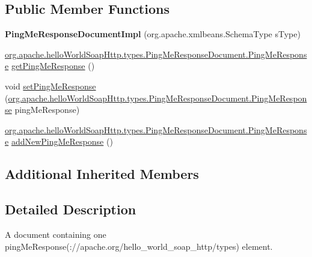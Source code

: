 \subsection*{Public Member Functions}
\begin{DoxyCompactItemize}
\item 
\hypertarget{classorg_1_1apache_1_1hello_world_soap_http_1_1types_1_1impl_1_1_ping_me_response_document_impl_a4f00943c705017667e77100457bf079a}{}{\bfseries Ping\+Me\+Response\+Document\+Impl} (org.\+apache.\+xmlbeans.\+Schema\+Type s\+Type)\label{classorg_1_1apache_1_1hello_world_soap_http_1_1types_1_1impl_1_1_ping_me_response_document_impl_a4f00943c705017667e77100457bf079a}

\item 
\hyperlink{interfaceorg_1_1apache_1_1hello_world_soap_http_1_1types_1_1_ping_me_response_document_1_1_ping_me_response}{org.\+apache.\+hello\+World\+Soap\+Http.\+types.\+Ping\+Me\+Response\+Document.\+Ping\+Me\+Response} \hyperlink{classorg_1_1apache_1_1hello_world_soap_http_1_1types_1_1impl_1_1_ping_me_response_document_impl_a1ae5c560f8c553c511a1318bc93695b2}{get\+Ping\+Me\+Response} ()
\item 
void \hyperlink{classorg_1_1apache_1_1hello_world_soap_http_1_1types_1_1impl_1_1_ping_me_response_document_impl_a4367f5d3eb9c3a5f6446a562bc6647b5}{set\+Ping\+Me\+Response} (\hyperlink{interfaceorg_1_1apache_1_1hello_world_soap_http_1_1types_1_1_ping_me_response_document_1_1_ping_me_response}{org.\+apache.\+hello\+World\+Soap\+Http.\+types.\+Ping\+Me\+Response\+Document.\+Ping\+Me\+Response} ping\+Me\+Response)
\item 
\hyperlink{interfaceorg_1_1apache_1_1hello_world_soap_http_1_1types_1_1_ping_me_response_document_1_1_ping_me_response}{org.\+apache.\+hello\+World\+Soap\+Http.\+types.\+Ping\+Me\+Response\+Document.\+Ping\+Me\+Response} \hyperlink{classorg_1_1apache_1_1hello_world_soap_http_1_1types_1_1impl_1_1_ping_me_response_document_impl_a9169fd4ca7870892b300fd958ff4b1a2}{add\+New\+Ping\+Me\+Response} ()
\end{DoxyCompactItemize}
\subsection*{Additional Inherited Members}


\subsection{Detailed Description}
A document containing one ping\+Me\+Response(\+://apache.org/hello\+\_\+world\+\_\+soap\+\_\+http/types) element.

